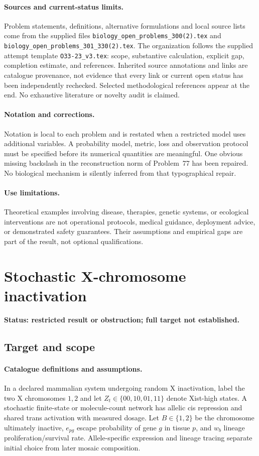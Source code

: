 \documentclass[11pt]{article}
\begin{document}
\paragraph{Sources and current-status limits.}
Problem statements, definitions, alternative formulations and local source lists
come from the supplied files
\texttt{biology\_open\_problems\_300(2).tex} and
\texttt{biology\_open\_problems\_301\_330(2).tex}.
The organization follows the supplied attempt template
\texttt{O33-23\_v3.tex}: scope, substantive calculation, explicit gap,
completion estimate, and references. Inherited source annotations and links are
catalogue provenance, not evidence that every link or current open status has
been independently rechecked. Selected methodological references appear at the
end. No exhaustive literature or novelty audit is claimed.

\paragraph{Notation and corrections.}
Notation is local to each problem and is restated when a restricted model uses
additional variables. A probability model, metric, loss and observation protocol
must be specified before its numerical quantities are meaningful. One obvious
missing backslash in the reconstruction norm of Problem~77 has been repaired.
No biological mechanism is silently inferred from that typographical repair.

\paragraph{Use limitations.}
Theoretical examples involving disease, therapies, genetic systems, or ecological
interventions are not operational protocols, medical guidance, deployment advice,
or demonstrated safety guarantees. Their assumptions and empirical gaps are part
of the result, not optional qualifications.


\section*{Stochastic X-chromosome inactivation}
\label{prob:037}
\noindent\textbf{Status: restricted result or obstruction; full target not established.}
\subsection{Target and scope}
\paragraph{Catalogue definitions and assumptions.}
In a declared mammalian system undergoing random X inactivation, label the two X chromosomes $1,2$ and let $Z_t\in\{00,10,01,11\}$ denote Xist-high states. A stochastic finite-state or molecule-count network has allelic cis repression and shared trans activation with measured dosage. Let $B\in\{1,2\}$ be the chromosome ultimately inactive, $e_{pg}$ escape probability of gene $g$ in tissue $p$, and $w_b$ lineage proliferation/survival rate. Allele-specific expression and lineage tracing separate initial choice from later mosaic composition.
\end{document}
